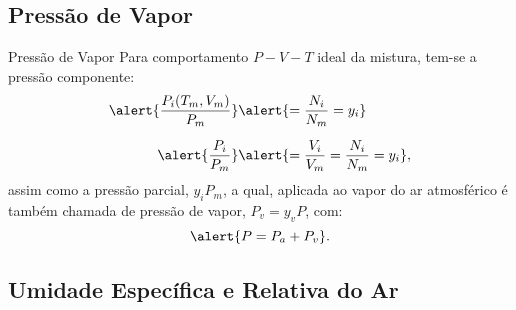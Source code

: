 \subsection{Pressão de Vapor}

    \begin{frame}{Pressão de Vapor}\vspace*{-0em}
        Para \alert{comportamento $P-V-T$ ideal} da mistura, tem-se a \alert{pressão
        componente}:
        \begin{align*}
            \alert{\frac{P_{i}(T_m, V_m)}{P_m}} &
            \alert{=\frac{N_{i}}{N_m} = y_{i}}
            \\[\medskipamount]
            \alert{\frac{P_i}{P_m}} &
            \alert{=\frac{V_i}{V_m} = \frac{N_i}{N_m} = y_i},
        \end{align*}
        assim como a \alert{pressão parcial}, \alert{$y_iP_m$}, a qual, aplicada ao vapor do ar
        atmosférico é também chamada de \alert{pressão de vapor}, \alert{$P_v = y_vP$}, com:
        \begin{equation*}
            \alert{
                P = P_a + P_v
            }.
        \end{equation*}
    \end{frame}

\subsection{Umidade Específica e Relativa do Ar}

